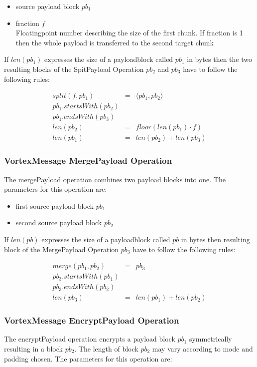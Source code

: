 \begin{itemize}
	\item source payload block $pb_1$
	\item fraction $f$\\
	      Floatingpoint number describing the size of the first chunk. If fraction is 1 then the whole payload is transferred to the second target chunk
\end{itemize}

If $len(pb_1)$ expresses the size of a payloadblock called $pb_1$ in bytes then the two resulting blocks of the SpitPayload Operation $pb_2$ and $pb_3$ have to follow the following rules:

\begin{eqnarray}
split(f, pb_1) & = &\langle pb_1, pb_2 \rangle\\
pb_1.startsWith(pb_2)\\
pb_1.endsWith(pb_3)\\
len(pb_2) & = & floor(len(pb_1)\cdot f)\\
len(pb_1) & = & len(pb_2) + len(pb_3)
\end{eqnarray}

\subsubsection{VortexMessage MergePayload Operation}
The mergePayload operation combines two payload blocks into one. The parameters for this operation are:

\begin{itemize}
	\item first source payload block $pb_1$
	\item second source payload block $pb_2$
\end{itemize}

If $len(pb)$ expresses the size of a payloadblock called $pb$ in bytes then resulting block of the MergePayload Operation $pb_3$ have to follow the following rules:

\begin{eqnarray}
merge(pb_1, pb_2) & = & pb_3 \\
pb_3.startsWith(pb_1)\\
pb_3.endsWith(pb_2)\\
len(pb_3) & = & len(pb_1) + len(pb_2)
\end{eqnarray}

\subsubsection{VortexMessage EncryptPayload Operation}
The encryptPayload operation encrypts a payload block $pb_1$ symmetrically resulting in a block $pb_2$. The length of block $pb_2$ may vary according to mode and padding chosen. The parameters for this operation are:

